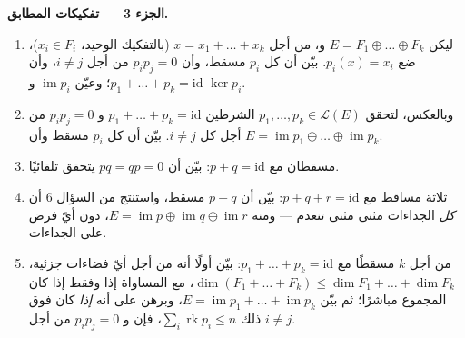 \begin{problem}
\medskip
\noindent\textbf{الجزء 3 --- تفكيكات  المطابق.}
\begin{enumerate}[resume]
  \item ليكن $E = F_1 \oplus \dots \oplus F_k$ و، من أجل $x = x_1 +
        \dots + x_k$ (بالتفكيك الوحيد، $x_i \in F_i$)، ضع
        $p_i(x) = x_i$. بيّن أن كل $p_i$ مسقط، وأن
        $p_i p_j = 0$ من أجل $i \neq j$، وأن $p_1 + \dots + p_k
        = \mathrm{id}$؛ وعيّن $\operatorname{im} p_i$ و
        $\ker p_i$.
  \item وبالعكس، لتحقق $p_1, \dots, p_k \in \mathcal{L}(E)$
        الشرطين $p_1 + \dots + p_k = \mathrm{id}$ و $p_i p_j =
        0$ من أجل كل $i \neq j$. بيّن أن كل $p_i$
        مسقط وأن $E = \operatorname{im} p_1 \oplus
        \dots \oplus \operatorname{im} p_k$.
  \item مسقطان مع $p + q = \mathrm{id}$: بيّن أن $pq
        = qp = 0$ يتحقق تلقائيًا.
  \item ثلاثة مساقط مع $p + q + r = \mathrm{id}$: بيّن
        أن $p + q$ مسقط، واستنتج من السؤال 6
        أن \emph{كل} الجداءات مثنى مثنى تنعدم --- ومنه $E =
        \operatorname{im} p \oplus \operatorname{im} q \oplus
        \operatorname{im} r$، دون أيّ فرض على الجداءات.
  \item من أجل $k$ مسقطًا مع $p_1 + \dots + p_k =
        \mathrm{id}$: بيّن أولًا أنه من أجل أيّ فضاءات جزئية، $\dim
        (F_1 + \dots + F_k) \leq \dim F_1 + \dots + \dim F_k$،
        مع المساواة إذا وفقط إذا كان المجموع مباشرًا؛ ثم
        بيّن $E = \operatorname{im} p_1 + \dots +
        \operatorname{im} p_k$، وبرهن على أنه \emph{إذا} كان
        فوق ذلك $\sum_i \operatorname{rk} p_i \leq n$، فإن  و $p_i p_j = 0$ من أجل $i \neq j$.
\end{enumerate}


\end{problem}
